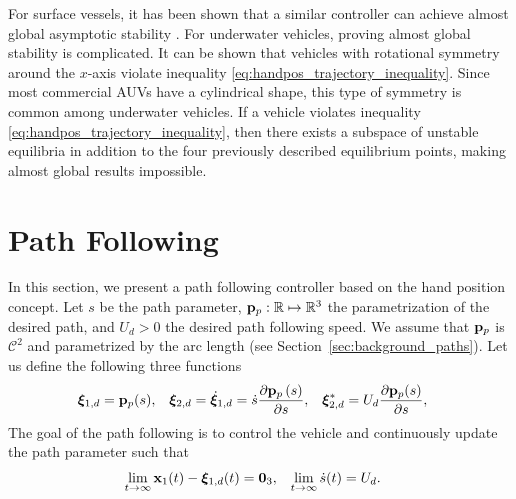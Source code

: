 \begin{rmk*}
    For surface vessels, it has been shown that a similar controller can achieve almost global asymptotic stability \cite{paliotta_trajectory_2019}.
    For underwater vehicles, proving almost global stability is complicated.
    It can be shown that vehicles with rotational symmetry around the $x$-axis violate inequality \eqref{eq:handpos_trajectory_inequality}.
    Since most commercial AUVs have a cylindrical shape, this type of symmetry is common among underwater vehicles.
    If a vehicle violates inequality \eqref{eq:handpos_trajectory_inequality}, then there exists a subspace of unstable equilibria in addition to the four previously described equilibrium points, making almost global results impossible.
\end{rmk*}

\section{Path Following}
\label{sec:handpos_trajectory_path_following}
In this section, we present a path following controller based on the hand position concept.
Let $s$ be the path parameter, $\mathbf{p}_p: \mathbb{R} \mapsto \mathbb{R}^{3}$ the parametrization of the desired path, and $U_d > 0$ the desired path following speed.
We assume that $\mathbf{p}_p$ is $\mathcal{C}^2$ and parametrized by the arc length (see Section~\ref{sec:background_paths}).
Let us define the following three functions
\begin{align}
    \bm{\xi}_{1, d} &= \mathbf{p}_p(s), &
    \bm{\xi}_{2, d} &= \dot{\bm{\xi}}_{1, d} = \dot{s}\frac{\partial \mathbf{p}_p\left(s\right)}{\partial s}, &
    \bm{\xi}_{2, d}^{*} &= U_d \frac{\partial \mathbf{p}_p(s)}{\partial s},
\end{align}
The goal of the path following is to control the vehicle and continuously update the path parameter such that
\begin{align}
    \lim_{t \rightarrow \infty} \mathbf{x}_1(t) - \bm{\xi}_{1, d}(t) &= \mathbf{0}_3, &
    \lim_{t \rightarrow \infty} \dot{s}(t) &= U_d. \label{eq:handpos_trajectory_control_goal_path}
\end{align}

